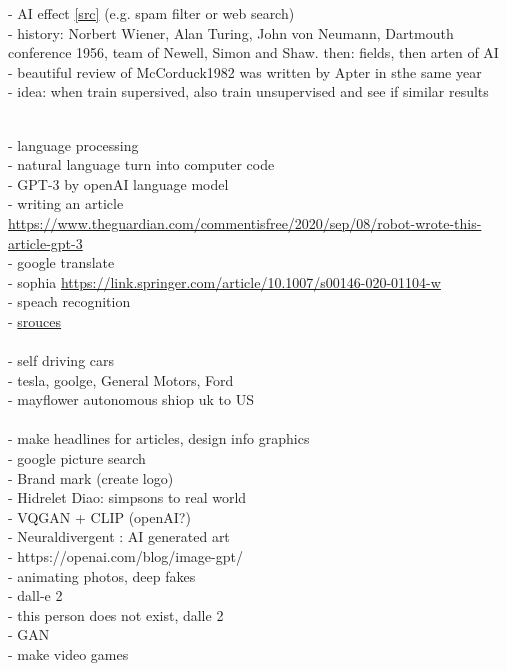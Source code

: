  - AI effect \href{https://ai100.stanford.edu/2016-report/section-i-what-artificial-intelligence/defining-ai#\_ftnref3}{[src]} \cite{McCorduck1982} (e.g. spam filter or web search) \\
 - history: Norbert Wiener, Alan Turing, John von Neumann, Dartmouth conference 1956, team of Newell, Simon and Shaw. then: fields, then arten of AI \\
 - beautiful review of McCorduck1982\cite{McCorduck1982} was written by Apter in sthe same year\cite{Apter1982}\\
 - idea: when train supersived, also train unsupervised and see if similar results
 
\\
 - language processing\\
 - natural language turn into computer code \\
 - GPT-3 by openAI language model \\
 - writing an article \url{https://www.theguardian.com/commentisfree/2020/sep/08/robot-wrote-this-article-gpt-3}\\
 - google translate \\
 - sophia \url{https://link.springer.com/article/10.1007/s00146-020-01104-w}\\
 - speach recognition\\
 - \href{https://ai100.stanford.edu/2021-report/standing-questions-and-responses/sq2-what-are-most-important-advances-ai#_2021SQ2ref3}{srouces}\\


\\
 - self driving cars\\
 - tesla, goolge, General Motors, Ford\\
 - mayflower autonomous shiop uk to US\\

\\
 - make headlines for articles, design info graphics\\
 - google picture search\\
 - Brand mark (create logo)\\
 - Hidrelet Diao: simpsons to real world \\
 - VQGAN + CLIP (openAI?)\\
 - Neuraldivergent : AI generated art\\
 - https://openai.com/blog/image-gpt/\\
 - animating photos, deep fakes\\
 - dall-e 2 \cite{Marcus2022}\\
 - this person does not exist, dalle 2 \\
 - GAN\\
 - make video games \cite{Guzdial2016}\\

